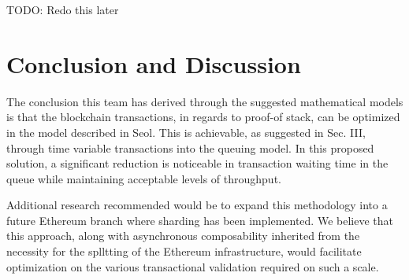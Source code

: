\documentclass[conference]{IEEEtran}
\begin{document}
TODO: Redo this later

\section{Conclusion and Discussion}

The conclusion this team has derived through the suggested mathematical models is that 
the blockchain transactions, in regards to proof-of stack, can be optimized in the model 
described in Seol\cite{2020_ACM_Seol}. This is achievable, as suggested in Sec. III, through 
time variable transactions into the queuing model. In this proposed solution, a significant 
reduction is noticeable in transaction waiting time in the queue while maintaining acceptable 
levels of throughput.

Additional research recommended would be to expand this methodology into a future 
Ethereum branch where sharding has been implemented. We believe that this approach, 
along with asynchronous composability inherited from the necessity for the splltting of the 
Ethereum infrastructure, would facilitate optimization on the various transactional validation 
required on such a scale.



\end{document}
